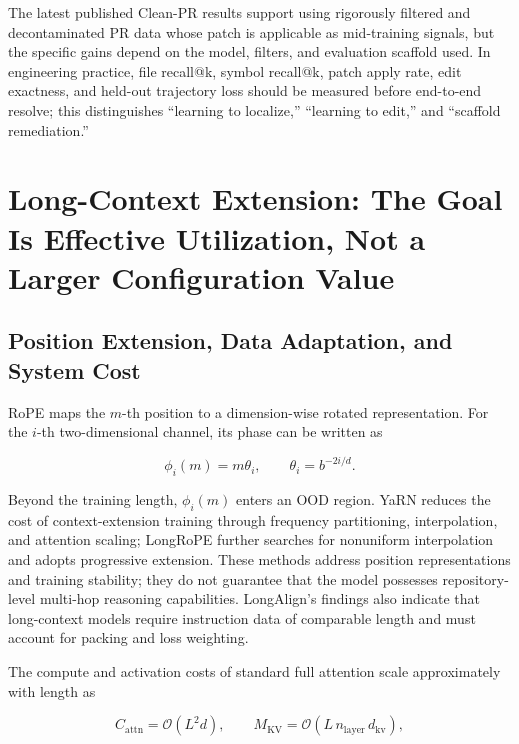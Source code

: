 \documentclass[10pt,a4paper,UTF8,fontset=none]{ctexart}
\newcommand{\metric}[1]{\textcolor{GoodGreen}{#1}}
\begin{document}
The latest published Clean-PR results support using rigorously filtered and decontaminated PR data whose patch is applicable as mid-training signals, but the specific gains depend on the model, filters, and evaluation scaffold used\cite{en:lo2026cleanpr}. In engineering practice, \metric{file recall@k}, \metric{symbol recall@k}, patch apply rate, edit exactness, and held-out trajectory loss should be measured before end-to-end resolve; this distinguishes ``learning to localize,'' ``learning to edit,'' and ``scaffold remediation.''

\section{Long-Context Extension: The Goal Is Effective Utilization, Not a Larger Configuration Value}

\subsection{Position Extension, Data Adaptation, and System Cost}

RoPE maps the $m$-th position to a dimension-wise rotated representation. For the $i$-th two-dimensional channel, its phase can be written as

\begin{equation}
\phi_i(m)=m\theta_i,\qquad \theta_i=b^{-2i/d}.
\label{en:eq:rope}
\end{equation}

Beyond the training length, $\phi_i(m)$ enters an OOD region. YaRN reduces the cost of context-extension training through frequency partitioning, interpolation, and attention scaling\cite{en:peng2023yarn}; LongRoPE further searches for nonuniform interpolation and adopts progressive extension\cite{en:ding2024longrope}. These methods address position representations and training stability; they do not guarantee that the model possesses repository-level multi-hop reasoning capabilities. LongAlign's findings also indicate that long-context models require instruction data of comparable length and must account for packing and loss weighting\cite{en:bai2024longalign}.

The compute and activation costs of standard full attention scale approximately with length as

\begin{equation}
C_{\mathrm{attn}}=\mathcal{O}(L^2 d),\qquad M_{\mathrm{KV}}=\mathcal{O}(L\,n_{\mathrm{layer}}\,d_{\mathrm{kv}}),
\label{en:eq:long-cost}
\end{equation}
\end{document}
